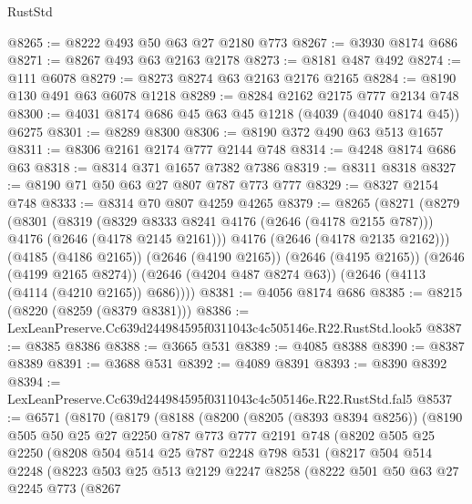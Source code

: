 \begin{lexlean}{RustStd}
\begin{coremodule}
@8265 := @8222 @493 @50 @63 @27 @2180 @773
@8267 := @3930 @8174 @686
@8271 := @8267 @493 @63 @2163 @2178
@8273 := @8181 @487 @492
@8274 := @111 @6078
@8279 := @8273 @8274 @63 @2163 @2176 @2165
@8284 := @8190 @130 @491 @63 @6078 @1218
@8289 := @8284 @2162 @2175 @777 @2134 @748
@8300 := @4031 @8174 @686 @45 @63 @45 @1218 (@4039 (@4040 @8174 @45)) @6275
@8301 := @8289 @8300
@8306 := @8190 @372 @490 @63 @513 @1657
@8311 := @8306 @2161 @2174 @777 @2144 @748
@8314 := @4248 @8174 @686 @63
@8318 := @8314 @371 @1657 @7382 @7386
@8319 := @8311 @8318
@8327 := @8190 @71 @50 @63 @27 @807 @787 @773 @777
@8329 := @8327 @2154 @748
@8333 := @8314 @70 @807 @4259 @4265
@8379 := @8265
    (@8271
      (@8279
        (@8301
          (@8319
            (@8329 @8333 @8241 @4176 (@2646 (@4178 @2155 @787)))
            @4176
            (@2646 (@4178 @2145 @2161)))
          @4176
          (@2646 (@4178 @2135 @2162)))
        (@4185 (@4186 @2165))
        (@2646 (@4190 @2165))
        (@2646 (@4195 @2165))
        (@2646 (@4199 @2165 @8274))
        (@2646 (@4204 @487 @8274 @63))
        (@2646 (@4113 (@4114 (@4210 @2165)) @686))))
@8381 := @4056 @8174 @686
@8385 := @8215 (@8220 (@8259 (@8379 @8381)))
@8386 := LexLeanPreserve.Cc639d244984595f0311043c4c505146e.R22.RustStd.look5
@8387 := @8385 @8386
@8388 := @3665 @531
@8389 := @4085 @8388
@8390 := @8387 @8389
@8391 := @3688 @531
@8392 := @4089 @8391
@8393 := @8390 @8392
@8394 := LexLeanPreserve.Cc639d244984595f0311043c4c505146e.R22.RustStd.fal5
@8537 := @6571
    (@8170
      (@8179
        (@8188
          (@8200
            (@8205 (@8393 @8394 @8256))
            (@8190
              @505
              @50
              @25
              @27
              @2250
              @787
              @773
              @777
              @2191
              @748
              (@8202
                @505
                @25
                @2250
                (@8208
                  @504
                  @514
                  @25
                  @787
                  @2248
                  @798
                  @531
                  (@8217
                    @504
                    @514
                    @2248
                    (@8223
                      @503
                      @25
                      @513
                      @2129
                      @2247
                      @8258
                      (@8222
                        @501
                        @50
                        @63
                        @27
                        @2245
                        @773
                        (@8267

\end{coremodule}
\end{lexlean}

